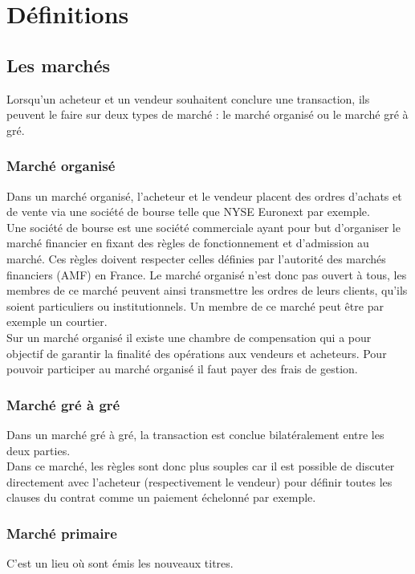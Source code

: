\section{Définitions}

\subsection{Les marchés}

Lorsqu'un acheteur et un vendeur souhaitent conclure une transaction, ils peuvent le faire sur deux types de marché : le marché organisé ou le marché gré à gré.  

\subsubsection{Marché organisé}
Dans un marché organisé, l'acheteur et le vendeur placent des ordres d'achats et de vente via une société de bourse telle que NYSE Euronext par exemple. \\

Une société de bourse est une société commerciale ayant pour but d'organiser le marché financier en fixant des règles de fonctionnement et d'admission au marché. Ces règles doivent respecter celles définies par l'autorité des marchés financiers (AMF) en France. Le marché organisé n'est donc pas ouvert à tous, les membres de ce marché peuvent ainsi transmettre les ordres de leurs clients, qu'ils soient particuliers ou institutionnels. Un membre de ce marché peut être par exemple un courtier. \\

Sur un marché organisé il existe une chambre de compensation qui a pour objectif de garantir la finalité des opérations aux vendeurs et acheteurs. Pour pouvoir participer au marché organisé il faut payer des frais de gestion. 

\subsubsection{Marché gré à gré}
Dans un marché gré à gré, la transaction est conclue bilatéralement entre les deux parties. \\

Dans ce marché, les règles sont donc plus souples car il est possible de discuter directement avec l'acheteur (respectivement le vendeur) pour définir toutes les clauses du contrat comme un paiement échelonné par exemple.  

\subsubsection{Marché primaire}
C'est un lieu où sont émis les nouveaux titres.

